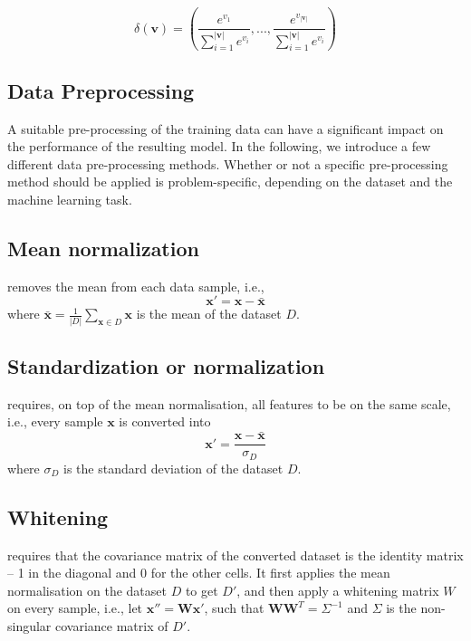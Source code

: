 \begin{equation}
    \delta(\textbf{v}) = (\frac{e^{v_1}}{\sum_{i=1}^{|\textbf{v}|}e^{v_i}},...,\frac{e^{v_{|\textbf{v}|}}}{\sum_{i=1}^{|\textbf{v}|}e^{v_i}}) 
\end{equation}

\subsection{Data Preprocessing}\label{sec:dataprocessing}

A suitable pre-processing of the training data can have a significant impact on the performance of the resulting model. In the following, we introduce a few different data pre-processing methods. Whether or not a specific pre-processing method should be applied is problem-specific, depending on the dataset and the machine learning task. 

\subsection*{Mean normalization} removes the mean from each data sample, i.e., 
\begin{equation}
    \textbf{x}'=\textbf{x}-\bar{\textbf{x}}
\end{equation}
where $\displaystyle\bar{\textbf{x}}=\frac{1}{|D|}\sum_{\textbf{x}\in D}\textbf{x}$ is the mean of the dataset $D$. 


\subsection*{Standardization or normalization} requires, on top of the mean normalisation, all features to be on the same scale, i.e., every sample $\textbf{x}$ is converted into 
\begin{equation}
    \textbf{x}'=\frac{\textbf{x}-\bar{\textbf{x}}}{\sigma_D}
\end{equation}
where $\sigma_D$ is the standard deviation of the dataset $D$.

\subsection*{Whitening} requires that the covariance matrix of the converted dataset is the identity matrix -- 1 in the diagonal and 0 for the other cells. It first applies the mean normalisation on the dataset $D$ to get $D'$, and then apply a whitening matrix $W$ on every sample, i.e., let $\textbf{x}''=\textbf{W}\textbf{x}'$, such that $\textbf{W}\textbf{W}^T=\Sigma^{-1}$ and $\Sigma$ is the non-singular covariance matrix of $D'$.

